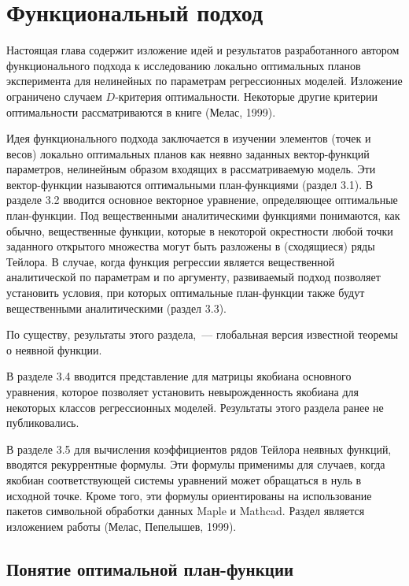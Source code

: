 


\chapter{Функциональный подход}



Настоящая глава содержит изложение идей и результатов разработанного
автором функционального подхода к исследованию локально оптимальных
планов эксперимента для нелинейных по параметрам регрессионных
моделей. Изложение ограничено случаем $D$-критерия оптимальности.
Некоторые другие критерии оптимальности рассматриваются в книге
(Мелас, 1999).

Идея функционального подхода заключается в изучении элементов (точек
и весов) локально оптимальных планов как неявно заданных
вектор-функций параметров, нелинейным образом входящих в
рассматриваемую модель. Эти вектор-функции называются оптимальными
план-функциями (раздел 3.1). В разделе 3.2 вводится основное
векторное уравнение, определяющее оптимальные план-функции. Под
вещественными аналитическими функциями понимаются, как обычно,
вещественные функции, которые в некоторой окрестности любой точки
заданного открытого множества могут быть разложены в (сходящиеся)
ряды Тейлора. В случае, когда функция регрессии является
вещественной аналитической по параметрам и по аргументу, развиваемый
подход позволяет установить условия, при которых оптимальные
план-функции также будут вещественными аналитическими (раздел 3.3).

По существу, результаты этого раздела,~--- глобальная версия
известной теоремы о неявной функции.

В разделе 3.4 вводится представление для матрицы якобиана основного
уравнения, которое позволяет установить невырожденность якобиана для
некоторых классов регрессионных моделей. Результаты этого раздела
ранее не публиковались.

В разделе 3.5 для вычисления коэффициентов рядов Тейлора неявных
функций, вводятся рекуррентные формулы. Эти формулы применимы для
случаев, когда якобиан соответствующей системы уравнений может
обращаться в нуль в исходной точке. Кроме того, эти формулы
ориентированы на использование пакетов символьной обработки данных
Maple и Mathcad. Раздел является изложением работы (Мелас,
Пепелышев, 1999).


\section{Понятие оптимальной план-функции}



